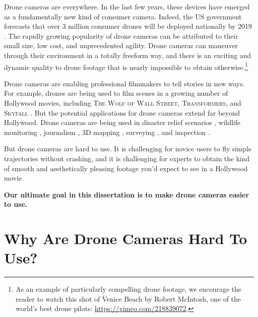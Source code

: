 Drone cameras are everywhere.
In the last few years, these devices have emerged as a fundamentally new kind of consumer camera.
Indeed, the US government forecasts that over 3 million consumer drones will be deployed nationally by 2019 \cite{faa:2017}.
The rapidly growing popularity of drone cameras can be attributed to their small size, low cost, and unprecedented agility.
Drone cameras can maneuver through their environment in a totally freeform way, and there is an exciting and dynamic quality to drone footage that is nearly impossible to obtain otherwise.\footnote{As an example of particularly compelling drone footage, we encourage the reader to watch this shot of Venice Beach by Robert McIntosh, one of the world's best drone pilots: \url{https://vimeo.com/218839072}.}

Drone cameras are enabling professional filmmakers to tell stories in new ways. 
For example, drones are being used to film scenes in a growing number of Hollywood movies, including \textsc{The Wolf of Wall Street}, \textsc{Transformers}, and \textsc{Skyfall} \cite{nyt:2014,wsj:2015}.
But the potential applications for drone cameras extend far beyond Hollywood.
Drone cameras are being used in disaster relief scenarios \cite{michael:2012}, wildlife monitoring \cite{duke:2017}, journalism \cite{indivisible:2017}, 3D mapping \cite{pix4d:2015}, surveying \cite{3dr:2017a}, and inspection \cite{alexis:2015}.

But drone cameras are hard to use.
It is challenging for novice users to fly simple trajectories without crashing, and it is challenging for experts to obtain the kind of smooth and aesthetically pleasing footage you'd expect to see in a Hollywood movie.

\begin{tcolorbox}[before skip=20pt, after skip=20pt, sharp corners]
\begin{center}
\textbf{Our ultimate goal in this dissertation is to make drone cameras easier to use.}
\end{center}
\end{tcolorbox}

\section{Why Are Drone Cameras Hard To Use?}


